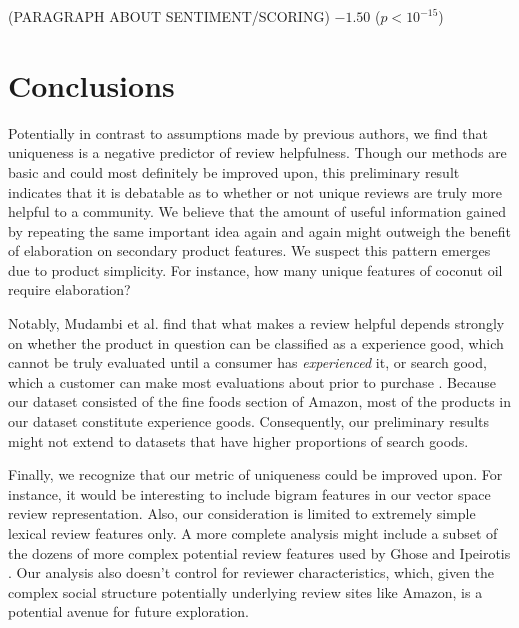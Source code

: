 \documentclass[10pt]{article}
\begin{document}
(PARAGRAPH ABOUT SENTIMENT/SCORING) $-1.50$ ($p < 10^{-15}$)

\section*{Conclusions}
Potentially in contrast to assumptions made by previous authors, we find that uniqueness is a negative predictor of review helpfulness. Though our methods are basic and could most definitely be improved upon, this preliminary result indicates that it is debatable as to whether or not unique reviews are truly more helpful to a community. We believe that the amount of useful information gained by repeating the same important idea again and again might outweigh the benefit of elaboration on secondary product features. We suspect this pattern emerges due to product simplicity. For instance, how many unique features of coconut oil require elaboration?

Notably, Mudambi et al. find that what makes a review helpful depends strongly on whether the product in question can be classified as a experience good, which cannot be truly evaluated until a consumer has \emph{experienced} it, or search good, which a customer can make most evaluations about prior to purchase \cite{mudambi2010makes}. Because our dataset consisted of the fine foods section of Amazon, most of the products in our dataset constitute experience goods. Consequently, our preliminary results might not extend to datasets that have higher proportions of search goods.

Finally, we recognize that our metric of uniqueness could be improved upon. For instance, it would be interesting to include bigram features in our vector space review representation. Also, our consideration is limited to extremely simple lexical review features only. A more complete analysis might include a subset of the dozens of more complex potential review features used by Ghose and Ipeirotis \cite{ghose2011estimating}. Our analysis also doesn't control for reviewer characteristics, which, given the complex social structure potentially underlying review sites like Amazon, is a potential avenue for future exploration.


\end{document}
